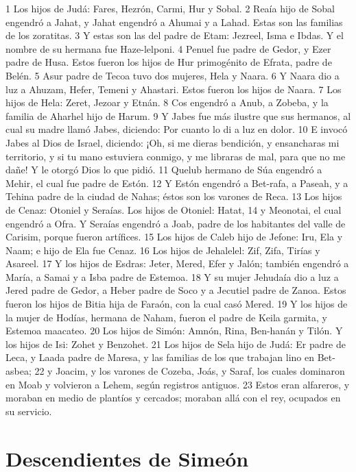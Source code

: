 1 Los hijos de Judá: Fares, Hezrón, Carmi, Hur y Sobal.
2 Reaía hijo de Sobal engendró a Jahat, y Jahat engendró a Ahumai y a Lahad. Estas son las familias de los zoratitas.
3 Y estas son las del padre de Etam: Jezreel, Isma e Ibdas. Y el nombre de su hermana fue Haze-lelponi.
4 Penuel fue padre de Gedor, y Ezer padre de Husa. Estos fueron los hijos de Hur primogénito de Efrata, padre de Belén.
5 Asur padre de Tecoa tuvo dos mujeres, Hela y Naara.
6 Y Naara dio a luz a Ahuzam, Hefer, Temeni y Ahastari. Estos fueron los hijos de Naara.
7 Los hijos de Hela: Zeret, Jezoar y Etnán.
8 Cos engendró a Anub, a Zobeba, y la familia de Aharhel hijo de Harum.
9 Y Jabes fue más ilustre que sus hermanos, al cual su madre llamó Jabes, diciendo: Por cuanto lo di a luz en dolor.
10 E invocó Jabes al Dios de Israel, diciendo: ¡Oh, si me dieras bendición, y ensancharas mi territorio, y si tu mano estuviera conmigo, y me libraras de mal, para que no me dañe! Y le otorgó Dios lo que pidió.
11 Quelub hermano de Súa engendró a Mehir, el cual fue padre de Estón.
12 Y Estón engendró a Bet-rafa, a Paseah, y a Tehina padre de la ciudad de Nahas; éstos son los varones de Reca.
13 Los hijos de Cenaz: Otoniel y Seraías. Los hijos de Otoniel: Hatat,
14 y Meonotai, el cual engendró a Ofra. Y Seraías engendró a Joab, padre de los habitantes del valle de Carisim, porque fueron artífices.
15 Los hijos de Caleb hijo de Jefone: Iru, Ela y Naam; e hijo de Ela fue Cenaz.
16 Los hijos de Jehalelel: Zif, Zifa, Tirías y Asareel.
17 Y los hijos de Esdras: Jeter, Mered, Efer y Jalón; también engendró a María, a Samai y a Isba padre de Estemoa.
18 Y su mujer Jehudaía dio a luz a Jered padre de Gedor, a Heber padre de Soco y a Jecutiel padre de Zanoa. Estos fueron los hijos de Bitia hija de Faraón, con la cual casó Mered.
19 Y los hijos de la mujer de Hodías, hermana de Naham, fueron el padre de Keila garmita, y Estemoa maacateo.
20 Los hijos de Simón: Amnón, Rina, Ben-hanán y Tilón. Y los hijos de Isi: Zohet y Benzohet.
21 Los hijos de Sela hijo de Judá: Er padre de Leca, y Laada padre de Maresa, y las familias de los que trabajan lino en Bet- asbea;
22 y Joacim, y los varones de Cozeba, Joás, y Saraf, los cuales dominaron en Moab y volvieron a Lehem, según registros antiguos.
23 Estos eran alfareros, y moraban en medio de plantíos y cercados; moraban allá con el rey, ocupados en su servicio.

\section*{Descendientes de Simeón}

